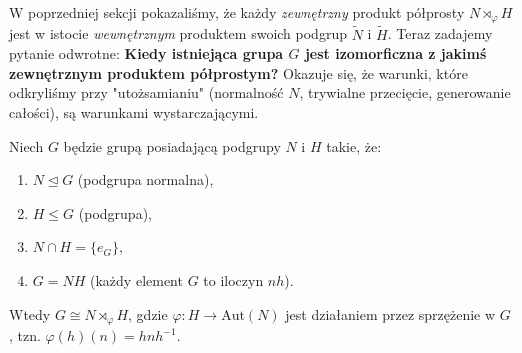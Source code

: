 \begin{context}
W poprzedniej sekcji pokazaliśmy, że każdy \textit{zewnętrzny} produkt półprosty $N \rtimes_\varphi H$ jest w istocie \textit{wewnętrznym} produktem swoich podgrup $\tilde{N}$ i $\tilde{H}$.
Teraz zadajemy pytanie odwrotne: \textbf{Kiedy istniejąca grupa $G$ jest izomorficzna z jakimś zewnętrznym produktem półprostym?}
Okazuje się, że warunki, które odkryliśmy przy "utożsamianiu" (normalność $N$, trywialne przecięcie, generowanie całości), są warunkami wystarczającymi.
\end{context}

\begin{theorem}
Niech $G$ będzie grupą posiadającą podgrupy $N$ i $H$ takie, że:
\begin{enumerate}
    \item $N \unlhd G$ (podgrupa normalna),
    \item $H \le G$ (podgrupa),
    \item $N \cap H = \{e_G\}$,
    \item $G = NH$ (każdy element $G$ to iloczyn $nh$).
\end{enumerate}
Wtedy $G \cong N \rtimes_\varphi H$, gdzie $\varphi: H \to \text{Aut}(N)$ jest działaniem przez sprzężenie w $G$, tzn. $\varphi(h)(n) = hnh^{-1}$.
\end{theorem}

